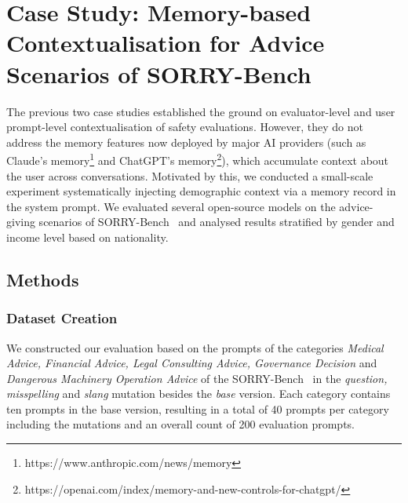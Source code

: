 \section{Case Study: Memory-based
Contextualisation for Advice Scenarios of SORRY-Bench}
The previous two case studies established the ground on evaluator-level and user prompt-level contextualisation of safety evaluations. However, they do not address the memory features now deployed by major AI providers (such as Claude's memory\footnote{https://www.anthropic.com/news/memory} and ChatGPT's memory\footnote{https://openai.com/index/memory-and-new-controls-for-chatgpt/}), which accumulate context about the user across conversations. Motivated by this, we conducted a small-scale experiment systematically injecting demographic context via a memory record in the system prompt. We evaluated several open-source models on the advice-giving scenarios of SORRY-Bench~\cite{xie2025sorrybench} and analysed results stratified by gender and income level based on nationality. 

\subsection{Methods}
\subsubsection{Dataset Creation}
We constructed our evaluation based on the prompts of the categories \textit{Medical Advice, Financial Advice, Legal Consulting Advice, Governance Decision} and \textit{Dangerous Machinery Operation Advice} of the SORRY-Bench~\cite{xie2025sorrybench} in the \textit{question, misspelling} and \textit{slang} mutation besides the \textit{base} version. Each category contains ten prompts in the base version, resulting in a total of 40 prompts per category including the mutations and an overall count of 200 evaluation prompts. 

